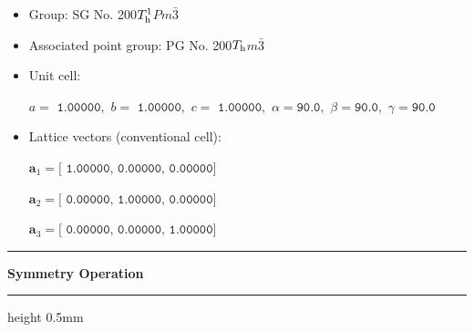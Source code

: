 \documentclass[fleqn,10pt,landscape]{jsarticle}
\begin{document}
\begin{itemize}
\item Group: SG No. 200\quad$T_{\rm h}^{1}$\quad$Pm\bar{3}$\quad[ cubic ]
\item Associated point group: PG No. 200\quad$T_{\rm h}$\quad$m\bar{3}$\quad[ cubic ]
\end{itemize}
\begin{itemize}
\item Unit cell:

\quad $a=\texttt{ 1.00000},\,\, b=\texttt{ 1.00000},\,\, c=\texttt{ 1.00000},\,\, \alpha=\texttt{90.0},\,\, \beta=\texttt{90.0},\,\, \gamma=\texttt{90.0}$

\item Lattice vectors (conventional cell):

\quad $\bm{a}_1=\texttt{[ 1.00000, 0.00000, 0.00000]}$

\quad $\bm{a}_2=\texttt{[ 0.00000, 1.00000, 0.00000]}$

\quad $\bm{a}_3=\texttt{[ 0.00000, 0.00000, 1.00000]}$

\end{itemize}
\vspace{5mm}
\noindent \rule[0.5mm]{5mm}{0.5mm}\hspace{3mm}\textbf{Symmetry Operation}\hspace{3mm}\leaders\hrule height 0.5mm\hfill\kern0pt
\vspace{3mm}
\end{document}
